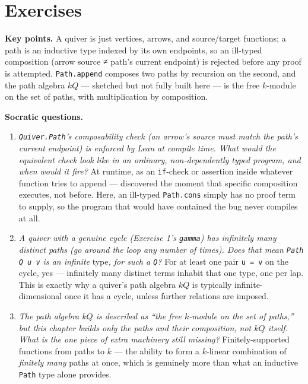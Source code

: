 \section{Exercises}\label{sec:11-path-algebras:06-exercises:1}

\textbf{Key points.} A quiver is just vertices, arrows, and source/target functions; a path is an inductive type indexed by its own endpoints, so an ill-typed composition (arrow source ≠ path's current endpoint) is rejected before any proof is attempted. \texttt{Path.append} composes two paths by recursion on the second, and the path algebra \(kQ\) --- sketched but not fully built here --- is the free \(k\)-module on the set of paths, with multiplication by composition.

\textbf{Socratic questions.}

\begin{enumerate}
\def\labelenumi{\arabic{enumi}.}
\item
  \emph{\texttt{Quiver.Path}'s composability check (an arrow's source must match the path's current endpoint) is enforced by Lean at compile time. What would the equivalent check look like in an ordinary, non-dependently typed program, and when would it fire?} At runtime, as an \texttt{if}-check or assertion inside whatever function tries to append --- discovered the moment that specific composition executes, not before. Here, an ill-typed \texttt{Path.cons} simply has no proof term to supply, so the program that would have contained the bug never compiles at all.
\item
  \emph{A quiver with a genuine cycle (Exercise 1's \texttt{gamma}) has infinitely many distinct paths (go around the loop any number of times). Does that mean \texttt{Path Q u v} is an infinite }type\emph{, for such a \texttt{Q}?} For at least one pair \texttt{u = v} on the cycle, yes --- infinitely many distinct terms inhabit that one type, one per lap. This is exactly why a quiver's path algebra \(kQ\) is typically infinite-dimensional once it has a cycle, unless further relations are imposed.
\item
  \emph{The path algebra \(kQ\) is described as ``the free \(k\)-module on the set of paths,'' but this chapter builds only the paths and their composition, not \(kQ\) itself. What is the one piece of extra machinery still missing?} Finitely-supported functions from paths to \(k\) --- the ability to form a \(k\)-linear combination of \emph{finitely many} paths at once, which is genuinely more than what an inductive \texttt{Path} type alone provides.

\end{enumerate}
